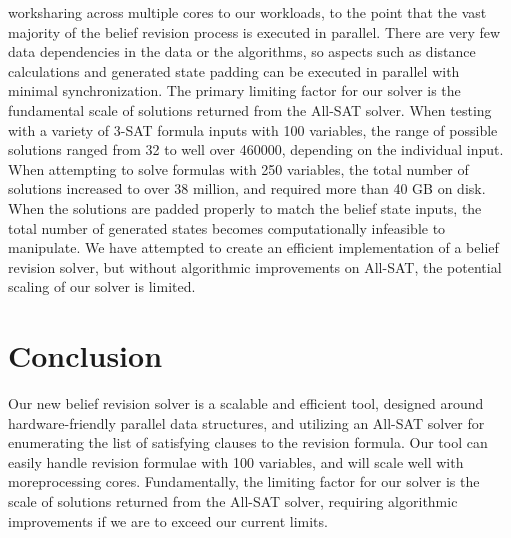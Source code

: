 \documentclass[english]{article}
\begin{document}
worksharing across multiple cores to our workloads, to the point that
the vast majority of the belief revision process is executed in parallel.
There are very few data dependencies in the data or the algorithms,
so aspects such as distance calculations and generated state padding
can be executed in parallel with minimal synchronization. The primary
limiting factor for our solver is the fundamental scale of solutions
returned from the All-SAT solver. When testing with a variety of 3-SAT
formula inputs with 100 variables, the range of possible solutions
ranged from 32 to well over 460000, depending on the individual input.
When attempting to solve formulas with 250 variables, the total number
of solutions increased to over 38 million, and required more than
40 GB on disk. When the solutions are padded properly to match the
belief state inputs, the total number of generated states becomes
computationally infeasible to manipulate. We have attempted to create
an efficient implementation of a belief revision solver, but without
algorithmic improvements on All-SAT, the potential scaling of our
solver is limited.

\section{Conclusion}

Our new belief revision solver is a scalable and efficient tool, designed
around hardware-friendly parallel data structures, and utilizing an
All-SAT solver for enumerating the list of satisfying clauses to the
revision formula. Our tool can easily handle revision formulae with
100 variables, and will scale well with moreprocessing cores. Fundamentally,
the limiting factor for our solver is the scale of solutions returned
from the All-SAT solver, requiring algorithmic improvements if we
are to exceed our current limits.
\end{document}
